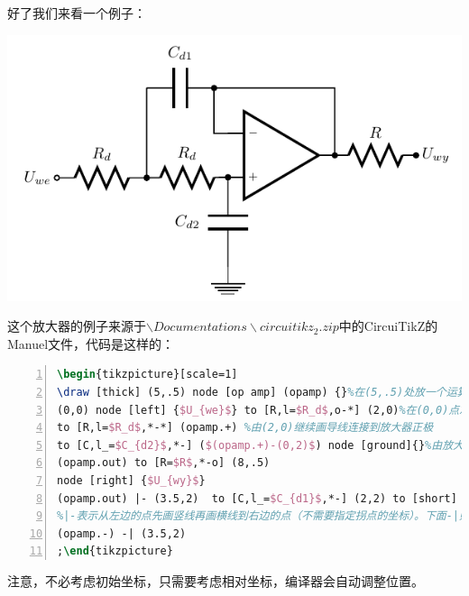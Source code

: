 \documentclass[12pt,a4paper,oneside]{book}
\begin{document}
{好了我们来看一个例子：
\par
\begin{minipage}{\linewidth}
\makebox[\linewidth]{}
\centering
{}
\includegraphics[scale=1]{figures/ao1.pdf}
\label{pic:ao1}
\end{minipage}
这个放大器的例子来源于$\backslash Documentations\backslash circuitikz_2.zip$中的CircuiTikZ的Manuel文件，代码是这样的：
\par
\begin{lstlisting}[language={TeX}, numbers=left, numberstyle=\tiny, keywordstyle=\color{blue!70},  frame=shadowbox, rulesepcolor=\color{red!20!green!20!blue!20}]
\begin{tikzpicture}[scale=1]
\draw [thick] (5,.5) node [op amp] (opamp) {}%在(5,.5)处放一个运算放大器
(0,0) node [left] {$U_{we}$} to [R,l=$R_d$,o-*] (2,0)%在(0,0)点左边加说明，然后画到(2,0)，中间是一个值为X的电阻R，o-*表示左端是空心点，右端实心点。
to [R,l=$R_d$,*-*] (opamp.+) %由(2,0)继续画导线连接到放大器正极
to [C,l_=$C_{d2}$,*-] ($(opamp.+)-(0,2)$) node [ground]{}%由放大器正极向正极坐标减去(0,2)的点画去，中间放置一个值为X的电容C
(opamp.out) to [R=$R$,*-o] (8,.5) 
node [right] {$U_{wy}$}
(opamp.out) |- (3.5,2)  to [C,l_=$C_{d1}$,*-] (2,2) to [short] (2,0)
%|-表示从左边的点先画竖线再画横线到右边的点（不需要指定拐点的坐标）。下面-|则是先画横线再画竖线。
(opamp.-) -| (3.5,2)
;\end{tikzpicture}
\end{lstlisting}
\par
注意，不必考虑初始坐标，只需要考虑相对坐标，编译器会自动调整位置。

}
\end{document}

